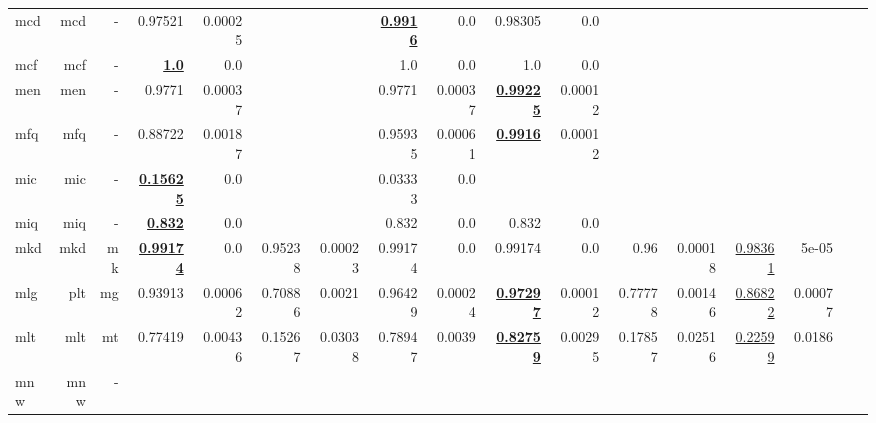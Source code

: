 \documentclass[11pt]{article}
\begin{document}
\begin{table*}[h]
{\begin{tabular}{lrrrrrrrrrrrrrrrr}
mcd         & mcd         & -         & 0.97521         & 0.00025         &          &          & \textbf{\underline{0.9916}}         & 0.0         & 0.98305         & 0.0         &          &          &          &          \\
mcf         & mcf         & -         & \textbf{\underline{1.0}}         & 0.0         &          &          & 1.0         & 0.0         & 1.0         & 0.0         &          &          &          &          \\
men         & men         & -         & 0.9771         & 0.00037         &          &          & 0.9771         & 0.00037         & \textbf{\underline{0.99225}}         & 0.00012         &          &          &          &          \\
mfq         & mfq         & -         & 0.88722         & 0.00187         &          &          & 0.95935         & 0.00061         & \textbf{\underline{0.9916}}         & 0.00012         &          &          &          &          \\
mic         & mic         & -         & \textbf{\underline{0.15625}}         & 0.0         &          &          & 0.03333         & 0.0         &          &          &          &          &          &          \\
miq         & miq         & -         & \textbf{\underline{0.832}}         & 0.0         &          &          & 0.832         & 0.0         & 0.832         & 0.0         &          &          &          &          \\
mkd         & mkd         & mk         & \textbf{\underline{0.99174}}         & 0.0         & 0.95238         & 0.00023         & 0.99174         & 0.0         & 0.99174         & 0.0         & 0.96         & 0.00018         & \underline{0.98361}         & 5e-05         \\
mlg         & plt         & mg         & 0.93913         & 0.00062         & 0.70886         & 0.0021         & 0.96429         & 0.00024         & \textbf{\underline{0.97297}}         & 0.00012         & 0.77778         & 0.00146         & \underline{0.86822}         & 0.00077         \\
mlt         & mlt         & mt         & 0.77419         & 0.00436         & 0.15267         & 0.03038         & 0.78947         & 0.0039         & \textbf{\underline{0.82759}}         & 0.00295         & 0.17857         & 0.02516         & \underline{0.22599}         & 0.0186         \\
mnw         & mnw         & -         &          &          &          &          &          &          &          &          &          &          &          &          \\

\end{tabular}}
\end{table*}
\end{document}
